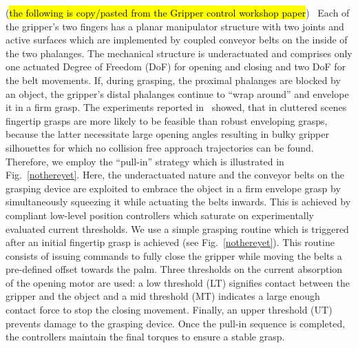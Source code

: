 (\hl{the following is copy/pasted from the Gripper control workshop paper})~\cite{Krug14c} Each of
the gripper’s two fingers has a planar manipulator structure with two joints and active surfaces
which are implemented by coupled conveyor belts on the inside of the two phalanges. The mechanical
structure is underactuated and comprises only one actuated Degree of Freedom (DoF) for opening and
closing and two DoF for the belt movements.  If, during grasping, the proximal phalanges are blocked
by an object, the gripper’s distal phalanges continue to “wrap around” and envelope it in a firm
grasp.  The experiments reported in~\cite{Krug14a} showed, that in cluttered scenes fingertip
grasps are more likely to be feasible than robust enveloping grasps, because the latter necessitate
large opening angles resulting in bulky gripper silhouettes for which no collision free approach
trajectories can be found. Therefore, we employ the “pull-in” strategy which is illustrated in
Fig.~\ref{nothereyet}. Here, the underactuated nature and the conveyor belts on the grasping device
are exploited to embrace the object in a firm envelope grasp by simultaneously squeezing it while
actuating the belts inwards. This is achieved by compliant low-level position controllers which
saturate on experimentally evaluated current thresholds. We use a simple grasping routine which is
triggered after an initial fingertip grasp is achieved (see Fig.~\ref{nothereyet}). This routine
consists of issuing commands to fully close the gripper while moving the belts a pre-defined offset
towards the palm. Three thresholds on the current absorption of the opening motor are used: a low
threshold (LT) signifies contact between the gripper and the object and a mid threshold (MT)
indicates a large enough contact force to stop the closing movement.  Finally, an upper threshold
(UT) prevents damage to the grasping device. Once the pull-in sequence is completed, the controllers
maintain the final torques to ensure a stable grasp.

